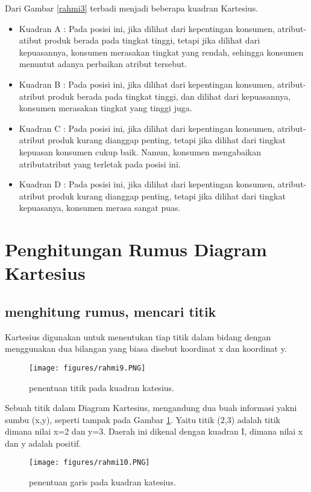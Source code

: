 Dari Gambar \ref{rahmi3} terbadi menjadi beberapa kuadran Kartesius.
\begin{itemize}
\item Kuadran A :
Pada posisi ini, jika dilihat dari kepentingan konsumen, atribut-atibut produk berada pada tingkat tinggi, tetapi jika dilihat dari kepuasannya, 
konsumen merasakan tingkat yang rendah, sehingga konsumen menuntut adanya perbaikan atribut tersebut.
\item Kuadran B :
Pada posisi ini, jika dilihat dari kepentingan konsumen, atribut-atribut produk berada pada tingkat tinggi, dan dilihat dari kepuasannya, 
konsumen merasakan tingkat yang tinggi juga.
\item Kuadran C :
Pada posisi ini, jika dilihat dari kepentingan konsumen, atribut-atribut produk kurang dianggap penting, tetapi jika dilihat dari tingkat kepuasan konsumen cukup baik.
Namun, konsumen mengabaikan atributatribut yang terletak pada posisi ini.
\item Kuadran D :
Pada posisi ini, jika dilihat dari kepentingan konsumen, atribut-atribut produk kurang dianggap penting, tetapi jika dilihat dari tingkat kepuasanya, konsumen merasa
sangat puas.
\end{itemize}


\section{Penghitungan Rumus Diagram Kartesius}
\subsection{menghitung rumus, mencari titik}

Kartesius digunakan untuk menentukan tiap titik dalam bidang dengan menggunakan dua bilangan yang biasa disebut koordinat x dan koordinat y.
\begin{figure}[ht]
	\centerline{\texttt{[image: figures/rahmi9.PNG]}}
	\caption{penentuan titik pada kuadran katesius.}
	\label{rahmi9}
\end{figure}

Sebuah titik dalam Diagram Kartesius, mengandung dua buah informasi yakni sumbu (x,y), seperti tampak pada Gambar \ref{rahmi9}. 
Yaitu titik (2,3) adalah titik dimana nilai x=2 dan y=3. Daerah ini dikenal dengan kuadran I, dimana nilai x dan y adalah positif.
\begin{figure}[ht]
	\centerline{\texttt{[image: figures/rahmi10.PNG]}}
	\caption{penentuan garis pada kuadran katesius.}
	\label{rahmi10}
	\end{figure}

